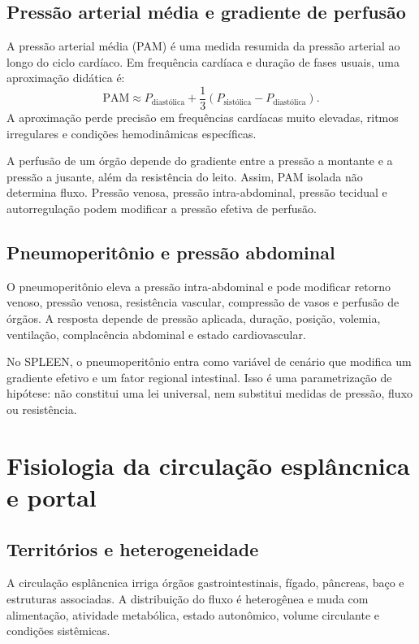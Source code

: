 \documentclass[11pt,a4paper,oneside]{book}
\newcommand{\MAP}{\mathrm{PAM}}
\begin{document}
\section{Pressão arterial média e gradiente de perfusão}
A pressão arterial média (PAM) é uma medida resumida da pressão arterial ao longo do ciclo cardíaco. Em frequência cardíaca e duração de fases usuais, uma aproximação didática é:
\begin{equation}
  \MAP \approx P_{\mathrm{diastólica}}+
  \frac{1}{3}(P_{\mathrm{sistólica}}-P_{\mathrm{diastólica}}).
\end{equation}
A aproximação perde precisão em frequências cardíacas muito elevadas, ritmos irregulares e condições hemodinâmicas específicas.

A perfusão de um órgão depende do gradiente entre a pressão a montante e a pressão a jusante, além da resistência do leito. Assim, PAM isolada não determina fluxo. Pressão venosa, pressão intra-abdominal, pressão tecidual e autorregulação podem modificar a pressão efetiva de perfusão.

\section{Pneumoperitônio e pressão abdominal}
O pneumoperitônio eleva a pressão intra-abdominal e pode modificar retorno venoso, pressão venosa, resistência vascular, compressão de vasos e perfusão de órgãos. A resposta depende de pressão aplicada, duração, posição, volemia, ventilação, complacência abdominal e estado cardiovascular.

No SPLEEN, o pneumoperitônio entra como variável de cenário que modifica um gradiente efetivo e um fator regional intestinal. Isso é uma parametrização de hipótese: não constitui uma lei universal, nem substitui medidas de pressão, fluxo ou resistência.

\chapter{Fisiologia da circulação esplâncnica e portal}

\section{Territórios e heterogeneidade}
A circulação esplâncnica irriga órgãos gastrointestinais, fígado, pâncreas, baço e estruturas associadas. A distribuição do fluxo é heterogênea e muda com alimentação, atividade metabólica, estado autonômico, volume circulante e condições sistêmicas.
\end{document}
